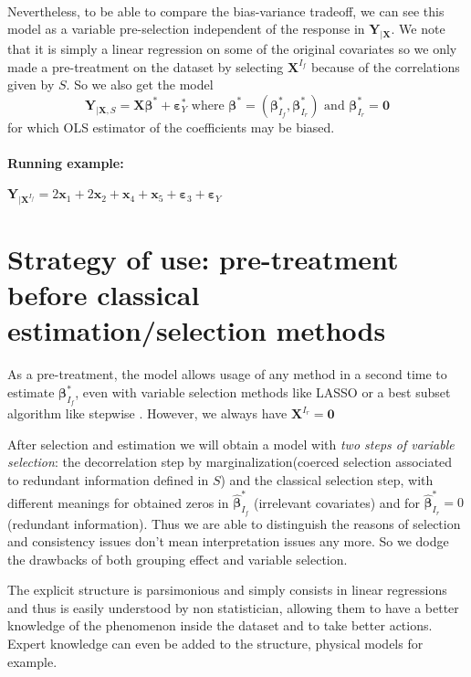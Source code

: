 \documentclass[12pt,a4paper]{report}
\begin{document}
\\
Nevertheless, to be able to compare the bias-variance tradeoff, we can see this model as a variable pre-selection independent of the response in $\boldsymbol{Y}_{|\boldsymbol{X}}$.
We note that it is simply a linear regression on some of the original covariates so we only made a pre-treatment on the dataset by selecting $\boldsymbol{X}^{I_f}$ because of the correlations given by $S$. So we also get the model
\begin{equation}
\boldsymbol{Y}_{|\boldsymbol{X},S}=\boldsymbol{X}\boldsymbol{\beta}^*+\boldsymbol{\varepsilon}_Y^* \textrm{ where }\boldsymbol{\beta}^*=(\boldsymbol{\beta}_{I_f}^*,\boldsymbol{\beta}_{I_r}^*) \textrm{ and } \boldsymbol{\beta}_{I_r}^*=\boldsymbol{0}
\end{equation}
	for which OLS estimator of the coefficients may be biased.  

\paragraph{Running example:} $\boldsymbol{Y}_{|\boldsymbol{X}^{I_f}}= 2\boldsymbol{x}_1+2\boldsymbol{x}_2+\boldsymbol{x}_4+\boldsymbol{x}_5+\boldsymbol{\varepsilon}_3 +\boldsymbol{\varepsilon}_Y$
\section{Strategy of use: pre-treatment before classical estimation/selection methods}\label{interpretation}

As a pre-treatment, the model allows usage of any method in a second time to estimate $\boldsymbol{\beta}_{I_f}^*$, even with variable selection methods like LASSO or a best subset algorithm like stepwise \cite{seber2012linear}. However, we always have $\boldsymbol{X}^{I_r}=\boldsymbol{0}$

After selection and estimation we will obtain a model with { \it two steps of variable selection}: the decorrelation step by marginalization(coerced selection associated to redundant information defined in $S$) and the classical selection step, with different meanings for obtained zeros in $\hat{\boldsymbol{\beta}}^*_{I_f}$ (irrelevant covariates) and for $\hat{\boldsymbol{\beta}}^*_{I_r}=0$ (redundant information). 
 Thus we are able to distinguish the reasons of selection and consistency issues don't mean interpretation issues any more. So we dodge the drawbacks of both grouping effect and variable selection.


The explicit structure is parsimonious and simply consists in linear regressions and thus is easily understood by non statistician, allowing them to have a better knowledge of the phenomenon inside the dataset and to take better actions. Expert knowledge can even be added to the structure, physical models for example.
\end{document}
